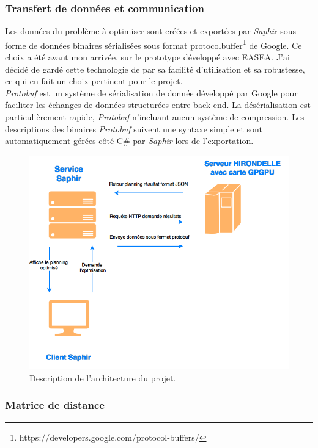\documentclass[french, 11pt]{memoir}
\begin{document}
\subsubsection{Transfert de données et
communication}\label{transfert-de-donnuxe9es-et-communication}

Les données du problème à optimiser sont créées et exportées par
\emph{Saphi}r sous forme de données binaires sérialisées sous format
protocolbuffer\footnote{https://developers.google.com/protocol-buffers/} de Google. Ce choix a été avant mon arrivée, sur le
prototype développé avec EASEA. J'ai décidé de gardé cette technologie
de par sa facilité d'utilisation et sa robustesse, ce qui en fait un
choix pertinent pour le projet.\\ 
\emph{Protobuf} est un système de
sérialisation de donnée développé par Google pour faciliter les échanges
de données structurées entre back-end. La désérialisation est
particulièrement rapide, \emph{Protobuf} n'incluant aucun système de
compression. Les descriptions des binaires \emph{Protobuf} suivent une
syntaxe simple et sont automatiquement gérées côté C\# par \emph{Saphir}
lors de l'exportation.

\begin{figure}[htbp]
	\begin{center}
		\includegraphics[width=5in]{img/communication.png}
		\caption{Description de l'architecture du projet.}
	\end{center}
\end{figure}


\subsubsection{Matrice de distance}\label{matrice-de-distance}
\end{document}
